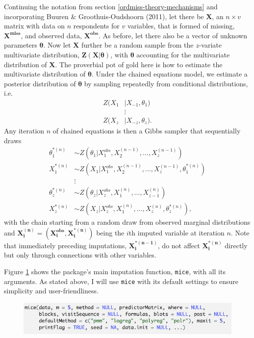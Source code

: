 \documentclass[12pt,econ]{sources/authesis}
\makeatletter
\def\maxwidth{\ifdim\Gin@nat@width>\linewidth\linewidth
\else\Gin@nat@width\fi}
\let\Oldincludegraphics\includegraphics
\renewcommand{\includegraphics}[1]{\Oldincludegraphics[width=\maxwidth]{#1}}
\def\caption{\refstepcounter\@captype \@dblarg{\@caption\@captype}}
\makeatother
\begin{document}
Continuing the notation from section \ref{ordmiss-theory-mechanisms} and incorporating Buuren \& Groothuis-Oudshoorn (2011), let there be \(\bm{X}\), an \(n \times v\) matrix with data on \(n\) respondents for \(v\) variables, that is formed of missing, \(\bm{X^{miss}}\), and observed data, \(\bm{X^{obs}}\). As before, let there also be a vector of unknown parameters \(\bm{\theta}\). Now let \(\bm{X}\) further be a random sample from the \(z\)-variate multivariate distribution, \(\bm{Z}(\bm{X} | \bm{\theta})\), with \(\bm{\theta}\) accounting for the multivariate distribution of \(\bm{X}\). The proverbial pot of gold here is how to estimate the multivariate distribution of \(\bm{\theta}\). Under the chained equations model, we estimate a posterior distribution of \(\bm{\theta}\) by sampling repeatedly from conditional distributions, i.e.
\begin{align}
Z(X_1 &| X_{-1}, \theta_1) \nonumber\\
&\vdots \nonumber\\
Z(X_z &| X_{-z}, \theta_z).
\end{align}
Any iteration \(n\) of chained equations is then a Gibbs sampler that sequentially draws
\begin{align}
\theta_1^{*(n)} &\sim Z(\theta_1 | X_1^{obs}, X_2^{(n-1)}, ..., X_z^{(n-1)}) \nonumber\\
X_1^{*(n)} &\sim Z(X_1 | X_1^{obs}, X_2^{(n-1)}, ..., X_z^{(n-1)}, \theta_1^{*(n)}) \nonumber\\
&\vdots \nonumber\\
\theta_z^{*(n)} &\sim Z(\theta_z | X_z^{obs}, X_1^{(n)}, ..., X_{z-1}^{(n)}) \nonumber\\
X_z^{*(n)} &\sim Z(X_z | X_z^{obs}, X_1^{(n)}, ..., X_z^{(n)}, \theta_z^{*(n)}),
\end{align}
with the chain starting from a random draw from observed marginal distributions and \(\bm{X_i^{(n)}} = (\bm{X_i^{obs}}, \bm{X_i^{*(n)}})\) being the \(i\)th imputed variable at iteration \(n\). Note that immediately preceding imputations, \(\bm{X_i^{*(n-1)}}\), do not affect \(\bm{X_i^{*(n)}}\) directly but only through connections with other variables.

Figure \ref{mice-func} shows the package's main imputation function, \texttt{mice}, with all its arguments. As stated above, I will use \texttt{mice} with its default settings to ensure simplicity and user-friendliness.

\vspace{0.5cm}
\begin{figure}[!htbp] 
  \centering
  \includegraphics{figures/mice.png}
  \caption{The \texttt{mice} Function}
  \label{mice-func}
\end{figure}
\vspace{-0.5cm}
\end{document}
